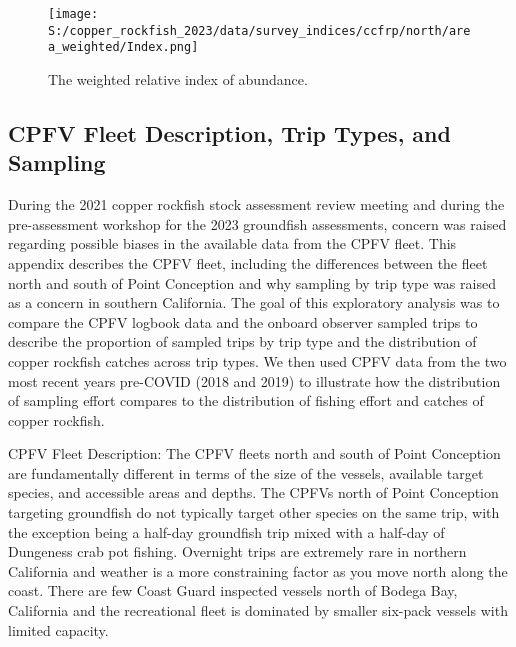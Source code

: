 \documentclass[11pt,
  letterpaper,
]{article}
\begin{document}
\newpage

\begin{figure}
{\centering
\texttt{[image: S:/copper\_rockfish\_2023/data/survey\_indices/ccfrp/north/area\_weighted/Index.png]}
}
\caption{The weighted relative index of abundance.\label{fig:ccfrp-index}}
\end{figure}

\subsection{CPFV Fleet Description, Trip Types, and Sampling}\label{cpfv-samples}

During the 2021 copper rockfish stock assessment review meeting and during the pre-assessment workshop for the 2023 groundfish assessments, concern was raised regarding possible biases in the available data from the CPFV fleet. This appendix describes the CPFV fleet, including the differences between the fleet north and south of Point Conception and why sampling by trip type was raised as a concern in southern California. The goal of this exploratory analysis was to compare the CPFV logbook data and the onboard observer sampled trips to describe the proportion of sampled trips by trip type and the distribution of copper rockfish catches across trip types. We then used CPFV data from the two most recent years pre-COVID (2018 and 2019) to illustrate how the distribution of sampling effort compares to the distribution of fishing effort and catches of copper rockfish.

CPFV Fleet Description: The CPFV fleets north and south of Point Conception are fundamentally different in terms of the size of the vessels, available target species, and accessible areas and depths. The CPFVs north of Point Conception targeting groundfish do not typically target other species on the same trip, with the exception being a half-day groundfish trip mixed with a half-day of Dungeness crab pot fishing. Overnight trips are extremely rare in northern California and weather is a more constraining factor as you move north along the coast. There are few Coast Guard inspected vessels north of Bodega Bay, California and the recreational fleet is dominated by smaller six-pack vessels with limited capacity.
\end{document}

